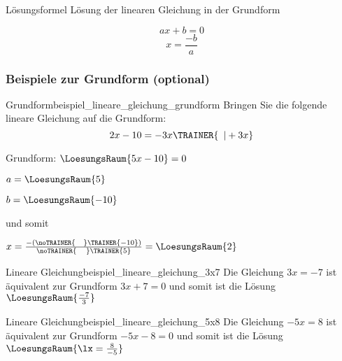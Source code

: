 \begin{gesetz}{Lösungsformel}{}
 Lösung der linearen Gleichung in der Grundform

 $$ax+b=0$$
  $$x = \frac{-b}a$$
  
\end{gesetz}


\subsubsection{Beispiele zur Grundform (optional)}


\begin{beispiel}{Grundform}{beispiel_lineare_gleichung_grundform}
  Bringen Sie die folgende lineare Gleichung auf die Grundform:
  $$2x-10 = -3x\TRAINER{\,\,\,| +3x}$$

  Grundform: $\LoesungsRaum{5x-10} = 0$

  $a = \LoesungsRaum{5}$

  $b = \LoesungsRaum{-10}$

  und somit

  \LARGE{$x=\frac{-(\noTRAINER{\,\,\,\,\,\,}\TRAINER{-10})}{\noTRAINER{\,\,\,\,\,\,\,}\TRAINER{5}}
    = \LoesungsRaum{2}$}

\end{beispiel}


\begin{beispiel}{Lineare Gleichung}{beispiel_lineare_gleichung_3x7}
  Die Gleichung $3x=-7$ ist äquivalent zur Grundform $3x+7=0$ und somit ist die Lösung $\LoesungsRaum{\frac{-7}{3}}$
  \end{beispiel}

\begin{beispiel}{Lineare Gleichung}{beispiel_lineare_gleichung_5x8}
  Die Gleichung $-5x=8$ ist äquivalent zur Grundform $-5x-8=0$ und somit ist die Lösung $\LoesungsRaum{\lx=\frac{8}{-5}}$
\end{beispiel}
\newpage


\newpage
\TALS{\newpage}
\TALS{}
  
\GESO{}

\newpage
